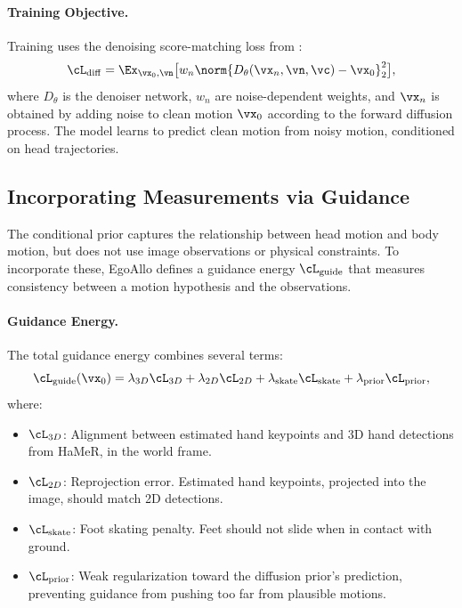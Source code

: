 \documentclass[../../book-main.tex]{subfiles}
\begin{document}
\paragraph{Training Objective.}
Training uses the denoising score-matching loss from :
\begin{equation}
    \cL_{\mathrm{diff}} = \Ex_{\vx_{0}, \vn} \big[ w_{n}
    \norm{D_{\theta}(\vx_{n}, \vn, \vc) - \vx_{0}}_{2}^{2} \big] ,
\end{equation}
where \(D_{\theta}\) is the denoiser network, \(w_{n}\) are noise-dependent
weights, and \(\vx_{n}\) is obtained by adding noise to clean motion
\(\vx_{0}\) according to the forward diffusion process. The model
learns to predict clean motion from noisy motion, conditioned on head
trajectories.

\subsection{Incorporating Measurements via Guidance}
\label{sub:egoallo_guidance}

The conditional prior captures the relationship between head motion
and body motion, but does not use image observations or physical
constraints. To incorporate these, EgoAllo defines a guidance energy
\(\cL_{\mathrm{guide}}\) that measures consistency between a
motion hypothesis and the observations.

\paragraph{Guidance Energy.}
The total guidance energy combines several terms:
\begin{equation}
    \cL_{\mathrm{guide}}(\vx_{0}) =
    \lambda_{3D}\cL_{3D} + \lambda_{2D}\cL_{2D} +
    \lambda_{\mathrm{skate}}\cL_{\mathrm{skate}} +
    \lambda_{\mathrm{prior}}\cL_{\mathrm{prior}} ,
\end{equation}
where:
\begin{itemize}
    \item \(\cL_{3D}\): Alignment between estimated hand
        keypoints and 3D hand detections from HaMeR, in the world frame.
    \item \(\cL_{2D}\): Reprojection error. Estimated hand
        keypoints, projected into the image, should match 2D detections.
    \item \(\cL_{\mathrm{skate}}\): Foot skating penalty. Feet
        should not slide when in contact with ground.
    \item \(\cL_{\mathrm{prior}}\): Weak regularization toward
        the diffusion prior's prediction, preventing guidance from
        pushing too far from plausible motions.
\end{itemize}
\end{document}
